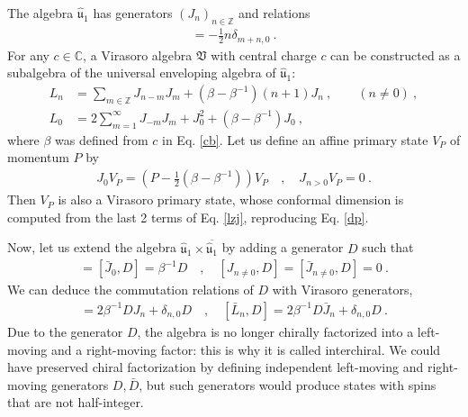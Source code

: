 \documentclass[12pt, a4paper]{article}
\theoremstyle{break}
\begin{document}
The algebra $\hat{\mathfrak{u}}_1$ has generators $(J_n)_{n\in\mathbb{Z}}$ and relations 
\begin{align}
 [J_m,J_n] = -\frac12 n\delta_{m+n,0}\ . 
\end{align}
For any $c\in\mathbb{C}$, a Virasoro algebra $\mathfrak{V}$ with central charge $c$ can be constructed as a subalgebra of the universal enveloping algebra of $\hat{\mathfrak{u}}_1$:
\begin{subequations}
\begin{align}
 L_n &= \sum_{m\in{\mathbb{Z}}} J_{n-m}J_m + \left(\beta-\beta^{-1}\right)(n+1)J_n\ , \qquad (n\neq 0)\ ,
\label{lnj}
\\
L_0 &=2\sum_{m=1}^\infty J_{-m}J_m +J_0^2+\left(\beta-\beta^{-1}\right)J_0 \ ,
\label{lzj}
\end{align}
\end{subequations}
where $\beta$ was defined from $c$ in Eq. \eqref{cb}. Let us define an affine primary state $V_P$ of momentum $P$ by 
\begin{align}
 J_0 V_P  = \left(P-\tfrac12\left(\beta-\beta^{-1}\right) \right) V_P \quad , \quad J_{n>0} V_P = 0\ .
\end{align}
Then $V_P$ is also a Virasoro primary state, whose conformal dimension is computed from the last 2 terms of Eq. \eqref{lzj}, reproducing Eq. \eqref{dp}. 

Now, let us extend the algebra $\hat{\mathfrak{u}}_1\times \overline{\hat{\mathfrak{u}}_1}$ by adding a generator $D$ such that 
\begin{align}
 [J_0,D] = [\bar J_0,D] = \beta^{-1}D \quad , \quad [J_{n\neq 0},D]=[\bar J_{n\neq 0},D]=0 \ .
\end{align}
We can deduce the commutation relations of $D$ with Virasoro generators,
\begin{align}
 [L_n,D] =2\beta^{-1}DJ_n +\delta_{n,0}D \quad , \quad [\bar L_n,D] =2\beta^{-1}D\bar J_n +\delta_{n,0}D\ .
\end{align}
Due to the generator $D$, the algebra is no longer chirally factorized into a left-moving and a right-moving factor: this is why it is called interchiral. We could have preserved chiral factorization by defining independent left-moving and right-moving generators $D,\bar D$, but such generators would produce states with spins that are not half-integer. 
\end{document}
